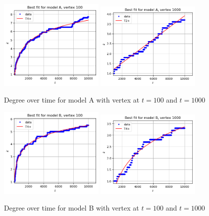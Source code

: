 \documentclass[a4paper]{article}
\begin{document}
%
\begin{figure}[H]
		\centering
		\includegraphics[width=0.45\textwidth]{modelA/best_dt100.png}
		\includegraphics[width=0.45\textwidth]{modelA/best_dt1000.png}
		\caption{Degree over time for model A with vertex at $t=100$ and $t=1000$}
		\label{fig:best_dt1000_A}
\end{figure}
%
\begin{figure}[H]
		\centering
		\includegraphics[width=0.45\textwidth]{modelB/best_dt100.png}
		\includegraphics[width=0.45\textwidth]{modelB/best_dt1000.png}
		\caption{Degree over time for model B with vertex at $t=100$ and $t=1000$}
\end{figure}
\end{document}
